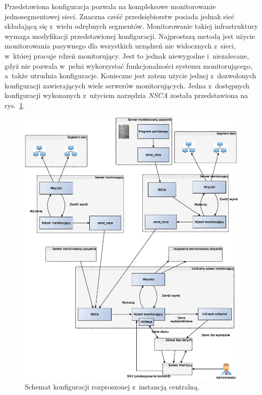 Przedstawiona konfiguracja pozwala na kompleksowe monitorowanie
jednosegmentowej sieci. Znaczna cześć przedsiębiorstw posiada jednak
sieć składającą się z~wielu odrębnych segmentów. Monitorowanie takiej
infrastruktury wymaga modyfikacji przedstawionej
konfiguracji. Najprostszą metodą jest użycie monitorowania pasywnego
dla wszystkich urządzeń nie widocznych z~sieci, w~której pracuje rdzeń
monitorujący. Jest to jednak niewygodne i~niezalecane, gdyż nie
pozwala w~pełni wykorzystać funkcjonalności systemu monitorującego,
a~także utrudnia konfiguracje. Konieczne jest zatem użycie jednej
z~dozwolonych konfiguracji zawierających wiele serwerów
monitorujących. Jedna z~dostępnych konfiguracji wykonanych z~użyciem
narzędzia {\em NSCA} została przedstawiona na rys.~\ref{fig:icingaNSCA}.

\begin{figure}[htpb]
  \caption{Schemat konfiguracji rozproszonej z~instancją centralną.}
  \label{fig:icingaNSCA}
\includegraphics[width=1\textwidth]{img/icingaNSCA}
\end{figure}

